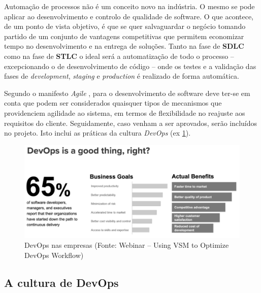 \hspace{1cm}Automação de processos não é um conceito novo na indústria. O mesmo se pode aplicar ao desenvolvimento e controlo de qualidade de software. O que acontece, de um ponto de vista objetivo, é que se quer salvaguardar o negócio tomando partido de um conjunto de vantagens competitivas que permitem economizar tempo no desenvolvimento e na entrega de soluções. Tanto na fase de \textbf{SDLC} como na fase de \textbf{STLC} o ideal será a automatização de todo o processo -- excepcionando o de desenvolvimento de código -- onde os testes e a validação das fases de \textit{development}, \textit{staging} e \textit{production} é realizado de forma automática.


\hspace{1cm}Segundo o manifesto \textit{Agile} \cite{beck2001manifesto}, para o desenvolvimento de software deve ter-se em conta que podem ser considerados quaisquer tipos de mecanismos que providenciem agilidade ao sistema, em termos de flexibilidade no reajuste aos requisitos do cliente. Seguidamente, caso venham a ser aprovados, serão incluídos no projeto. Isto inclui as práticas da cultura \textit{DevOps} (ex \ref{Fig:Fig1}).

\begin{figure}[hbt!]
\centering
\includegraphics[width=0.9\linewidth]{Cap1/Figura1.png}
\caption{DevOps nas empresas (Fonte: Webinar -- Using VSM to Optimize DevOps Workflow)}
\label{Fig:Fig1}
\end{figure}

\subsection{A cultura de DevOps}

